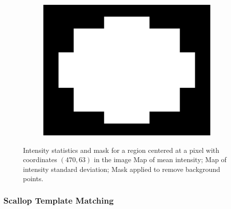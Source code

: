 \documentclass {udthesis}
\begin{document}
\begin{figure}
\begin{subfigure}[]{0.3\textwidth}
      \includegraphics[width=\textwidth]{mask_centered}
      \caption{}
      \label{subfig:mask_scallop}
  \end{subfigure}
  \caption[Illustration of scallop profile hypothesis]{Intensity statistics and mask for a region centered at a pixel with coordinates $(470,63)$ in the image  Map of mean intensity;  Map of intensity standard deviation;
   Mask applied to remove background points.}
  \label{fig:scallop_learning_mask}
\end{figure}


\subsubsection{Scallop Template Matching} \label{subsubsec:scallop_template_matching}
\end{document}
